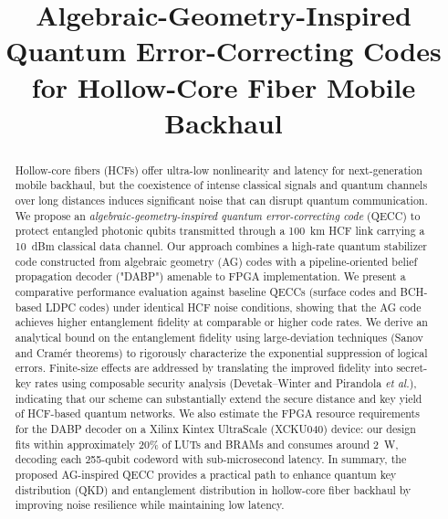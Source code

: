 \documentclass[conference]{IEEEtran}  %
\begin{document}
\title{Algebraic-Geometry-Inspired Quantum Error-Correcting Codes for Hollow-Core Fiber Mobile Backhaul}

\author{} %

\maketitle

\begin{abstract}
Hollow-core fibers (HCFs) offer ultra-low nonlinearity and latency for next-generation mobile backhaul, but the coexistence of intense classical signals and quantum channels over long distances induces significant noise that can disrupt quantum communication. We propose an \emph{algebraic-geometry-inspired quantum error-correcting code} (QECC) to protect entangled photonic qubits transmitted through a 100~km HCF link carrying a 10~dBm classical data channel. Our approach combines a high-rate quantum stabilizer code constructed from algebraic geometry (AG) codes with a pipeline-oriented belief propagation decoder ("DABP") amenable to FPGA implementation. We present a comparative performance evaluation against baseline QECCs (surface codes and BCH-based LDPC codes) under identical HCF noise conditions, showing that the AG code achieves higher entanglement fidelity at comparable or higher code rates. We derive an analytical bound on the entanglement fidelity using large-deviation techniques (Sanov and Cramér theorems) to rigorously characterize the exponential suppression of logical errors. Finite-size effects are addressed by translating the improved fidelity into secret-key rates using composable security analysis (Devetak–Winter and Pirandola \emph{et al.}), indicating that our scheme can substantially extend the secure distance and key yield of HCF-based quantum networks. We also estimate the FPGA resource requirements for the DABP decoder on a Xilinx Kintex UltraScale (XCKU040) device: our design fits within approximately 20\% of LUTs and BRAMs and consumes around 2~W, decoding each 255-qubit codeword with sub-microsecond latency. In summary, the proposed AG-inspired QECC provides a practical path to enhance quantum key distribution (QKD) and entanglement distribution in hollow-core fiber backhaul by improving noise resilience while maintaining low latency. 
\end{abstract}
\end{document}
